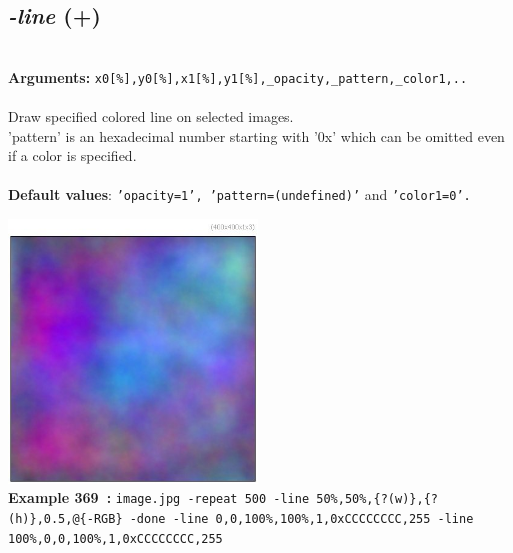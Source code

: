 \documentclass[a4paper,11pt,twoside]{book}
\begin{document}
\subsection{\emph{-line} (+)}\vspace*{-0.5em}
~\\\textbf{Arguments: } 
{\small \texttt{x0[\%],y0[\%],x1[\%],y1[\%],\_opacity,\_pattern,\_color1,..}}\\~\\
Draw specified colored line on selected images.
~\\'pattern' is an hexadecimal number starting with '0x' which can be omitted
even if a color is specified.
~\\~\\\textbf{Default values}: {\small \texttt{'opacity=1', 'pattern=(undefined)'} and \texttt{'color1=0'.}}
\begin{center}\includegraphics[keepaspectratio=true,height=7cm,width=\textwidth]{img/gmic_def369.jpg}\\
{\footnotesize \textbf{Example 369~:} \texttt{image.jpg -repeat 500 -line 50\%,50\%,\{?(w)\},\{?(h)\},0.5,@\{-RGB\} -done -line 0,0,100\%,100\%,1,0xCCCCCCCC,255 -line 100\%,0,0,100\%,1,0xCCCCCCCC,255}}
\end{center}
\end{document}
